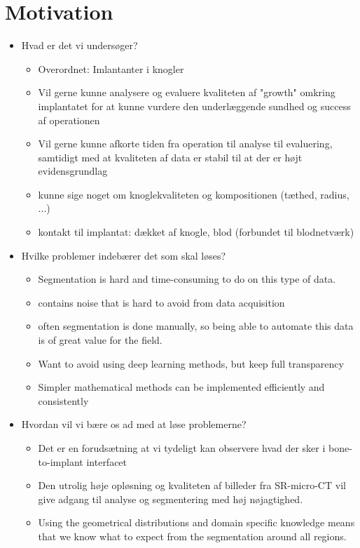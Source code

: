 
\section*{Motivation}

\begin{itemize}
 \item Hvad er det vi undersøger?
     \begin{itemize}
     	\item Overordnet: Imlantanter i knogler
     	\item Vil gerne kunne analysere og evaluere kvaliteten af "growth" omkring implantatet for at kunne vurdere den underlæggende sundhed og success af operationen
     	\item Vil gerne kunne afkorte tiden fra operation til analyse til evaluering, samtidigt med at kvaliteten af data er stabil til at der er højt evidensgrundlag
     	\item kunne sige noget om knoglekvaliteten og kompositionen (tæthed, radius, ...)
     	\item kontakt til implantat: dækket af knogle, blod (forbundet til blodnetværk)
     \end{itemize}
 \item Hvilke problemer indebærer det som skal løses?
     \begin{itemize}
     	\item Segmentation is hard and time-consuming to do on this type of data.
     	\item contains noise that is hard to avoid from data acquisition
     	\item often segmentation is done manually, so being able to automate this data is of great value for the field.
     	\item Want to avoid using deep learning methods, but keep full transparency 
     	\item Simpler mathematical methods can be implemented efficiently and consistently
     \end{itemize}
 \item Hvordan vil vi bære os ad med at løse problemerne?
     \begin{itemize}
     	\item Det er en forudsætning at vi tydeligt kan observere hvad der sker i bone-to-implant interfacet
     	\item Den utrolig høje opløsning og kvaliteten af billeder fra SR-micro-CT vil give adgang til analyse og segmentering med høj nøjagtighed.
     	\item Using the geometrical distributions and domain specific knowledge means that we know what to expect from the segmentation around all regions.
     \end{itemize}
\end{itemize}

